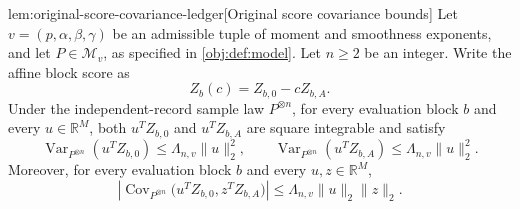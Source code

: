 \documentclass[11pt]{article}
\begin{document}
\begin{lemmav}{lem:original-score-covariance-ledger}[Original score covariance bounds]
Let \(v=(p,\alpha,\beta,\gamma)\) be an admissible tuple of moment and smoothness exponents, and let \(P\in\mathcal M_v\), as specified in \cref{obj:def:model}. Let \(n\ge 2\) be an integer. Write the affine block score as
\[
Z_b(c)=Z_{b,0}-cZ_{b,A}.
\]
Under the independent-record sample law \(P^{\otimes n}\), for every evaluation block \(b\) and every \(u\in\mathbb R^M\), both \(u^T Z_{b,0}\) and \(u^T Z_{b,A}\) are square integrable and satisfy
\[
\operatorname{Var}_{P^{\otimes n}}(u^T Z_{b,0})
\le \Lambda_{n,v}\|u\|_2^2,
\qquad
\operatorname{Var}_{P^{\otimes n}}(u^T Z_{b,A})
\le \Lambda_{n,v}\|u\|_2^2.
\]
Moreover, for every evaluation block \(b\) and every \(u,z\in\mathbb R^M\),
\[
\left|
\operatorname{Cov}_{P^{\otimes n}}
\bigl(u^T Z_{b,0},z^T Z_{b,A}\bigr)
\right|
\le \Lambda_{n,v}\|u\|_2\|z\|_2.
\]
\end{lemmav}
\end{document}
